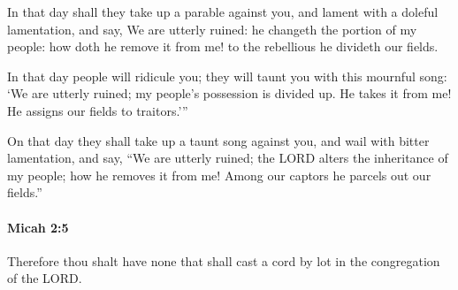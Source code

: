 			\begin{versebox}
					\item[BHS] 
					\item[LXX] 
					\item[ASV] In that day shall they take up a parable against you, and lament with a doleful lamentation, and say, We are utterly ruined: he changeth the portion of my people: how doth he remove it from me! to the rebellious he divideth our fields.
					\item[NIV] In that day people will ridicule you; they will taunt you with this mournful song: ‘We are utterly ruined; my people’s possession is divided up. He takes it from me! He assigns our fields to traitors.’”
					\item[NRSV] On that day they shall take up a taunt song against you, and wail with bitter lamentation, and say, “We are utterly ruined; the LORD alters the inheritance of my people; how he removes it from me! Among our captors he parcels out our fields.”
			\end{versebox}

		\paragraph{Micah 2:5} %
			\label{MICAH-2-5}

			Therefore thou shalt have none that shall cast a cord by lot in the congregation of the LORD.

